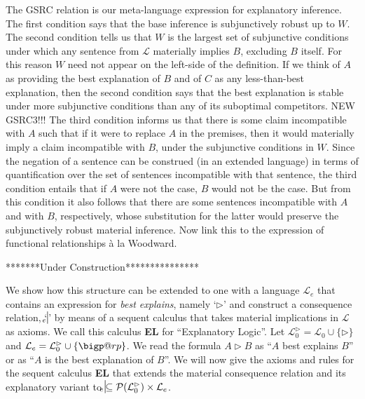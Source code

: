 \documentclass{article}
\makeatletter
\newcommand{\nce}{\turnstile{s}{w}{e}{}{n}}
\newcommand{\bigperp}{%
  \mathop{\mathpalette\bigp@rp\relax}%
  \displaylimits
}
\newcommand{\bigp@rp}[2]{%
  \vcenter{
    \m@th\hbox{\scalebox{\ifx#1\displaystyle2.1\else1.5\fi}{$#1\perp$}}
  }%
}
\makeatother
\begin{document}
The GSRC relation is our meta-language expression for explanatory inference. The first condition says that the base inference is subjunctively robust up to $W$. The second condition tells us that $W$ is the largest set of subjunctive conditions under which any sentence from $\mathcal{L}$ materially implies $B$, excluding $B$ itself. For this reason $W $ need not appear on the left-side of the definition. If we think of $ A $ as providing the best explanation of $ B $ and of $ C $ as any less-than-best explanation, then the second condition says that the best explanation is stable under more subjunctive conditions than any of its suboptimal competitors. \color{red} NEW GSRC3!!! The third condition informs us that there is some claim incompatible with $A$ such that if it were to replace $A$ in the premises, then it would materially imply a claim incompatible with $B$, under the subjunctive conditions in $W$. Since the negation of a sentence can be construed (in an extended language) in terms of quantification over the set of sentences incompatible with that sentence, the third condition entails that if $A$ were not the case, $B$ would not be the case. But from this condition it also follows that there are some sentences incompatible with $A$ and with $B$, respectively, whose substitution for the latter would preserve the subjunctively robust material inference.  Now link this to the expression of functional relationships \`{a} la Woodward.\color{black}



\vspace{1cm}
*******Under Construction***************

We show how this structure can be extended to one with a language $ \mathcal{L}_e $ that contains an expression for \textit{best explains}, namely `$ \rhd $' and construct a consequence relation, `$ \nce $' by means of a sequent calculus that takes material implications in $ \mathcal{L} $ as axioms. We call this calculus \textbf{EL} for ``Explanatory Logic''. Let $ \mathcal{L}_0^\rhd = \mathcal{L}_0 \cup \{\rhd\} $ and $ \mathcal{L}_e = \mathcal{L}_0^\rhd \cup \{\bigperp\} $. We read the formula $ A \rhd B $ as ``$ A $ best explains $ B $'' or as ``$ A $ is the best explanation of $ B $''. We will now give the axioms and rules for the sequent calculus \textbf{EL} that extends the material consequence relation and its explanatory variant to  $ \nce \subseteq \mathcal{P}(\mathcal{L}_0^\rhd) \times \mathcal{L}_e$.
\end{document}
